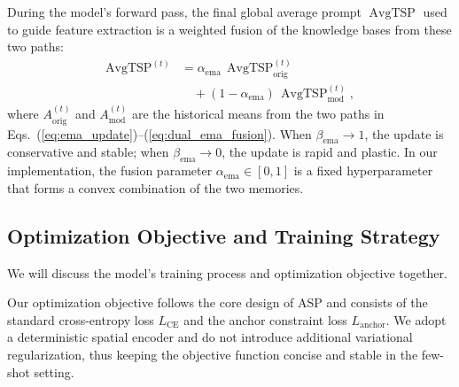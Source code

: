 ﻿\documentclass[letterpaper,journal]{IEEEtran}
\begin{document}
During the model's forward pass, the final global average prompt $\operatorname{AvgTSP}$ used to guide feature extraction is a weighted fusion of the knowledge bases from these two paths:
\begin{equation}
\begin{aligned}
\operatorname{AvgTSP}^{(t)} &= \alpha_{\mathrm{ema}}\, \operatorname{AvgTSP}_{\text{orig}}^{(t)} \\
&\quad + (1-\alpha_{\mathrm{ema}})\, \operatorname{AvgTSP}_{\text{mod}}^{(t)},
\end{aligned}
\label{eq:dual_ema_fusion}
\end{equation} where $A_{\text{orig}}^{(t)}$ and $A_{\text{mod}}^{(t)}$ are the historical means from the two paths in Eqs.~(\ref{eq:ema_update})--(\ref{eq:dual_ema_fusion}). When $\beta_{\text{ema}}\to 1$, the update is conservative and stable; when $\beta_{\text{ema}}\to 0$, the update is rapid and plastic. In our implementation, the fusion parameter $\alpha_{\mathrm{ema}}\in[0,1]$ is a fixed hyperparameter that forms a convex combination of the two memories.

\subsection{Optimization Objective and Training Strategy}
We will discuss the model's training process and optimization objective together.

Our optimization objective follows the core design of ASP \cite{liu2024} and consists of the standard cross-entropy loss $L_{\text{CE}}$ and the anchor constraint loss $L_{\text{anchor}}$. We adopt a deterministic spatial encoder and do not introduce additional variational regularization, thus keeping the objective function concise and stable in the few-shot setting.
\end{document}
